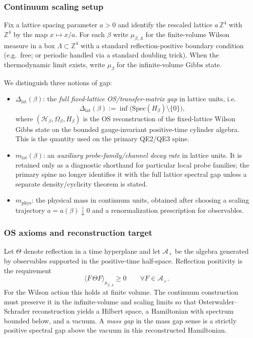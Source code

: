\subsubsection{Continuum scaling setup}
Fix a lattice spacing parameter $a>0$ and identify the rescaled lattice $a\,\mathbb Z^4$ with $\mathbb Z^4$ by the map
$x\mapsto x/a$. For each $\beta$ write $\mu_{\beta,\Lambda}$ for the finite-volume Wilson measure in a box
$\Lambda\subset\mathbb Z^4$ with a standard reflection-positive boundary condition (e.g.\ free; or periodic handled
via a standard doubling trick).
When the thermodynamic limit exists, write $\mu_\beta$ for the infinite-volume Gibbs state.

We distinguish three notions of gap:
\begin{itemize}[leftmargin=*]
\item $\Delta_{\mathrm{lat}}(\beta)$: the \emph{full fixed-lattice OS/transfer-matrix gap} in lattice units, i.e.
\[
\Delta_{\mathrm{lat}}(\beta):=\inf\bigl(\mathrm{Spec}(H_\beta)\setminus\{0\}\bigr),
\]
where $(\mathcal H_\beta,\Omega_\beta,H_\beta)$ is the OS reconstruction of the fixed-lattice Wilson Gibbs state on the bounded gauge-invariant positive-time cylinder algebra.
This is the quantity used on the primary QE2/QE3 spine.
\item $m_{\mathrm{lat}}(\beta)$: an \emph{auxiliary probe-family/channel decay rate} in lattice units.
It is retained only as a diagnostic shorthand for particular local probe families; the primary spine no longer identifies it with the full lattice spectral gap unless a separate density/cyclicity theorem is stated.
\item $m_{\mathrm{phys}}$: the physical mass in continuum units, obtained after choosing a scaling trajectory $a=a(\beta)\downarrow 0$
and a renormalization prescription for observables.
\end{itemize}

\subsubsection{OS axioms and reconstruction target}
Let $\Theta$ denote reflection in a time hyperplane and let $\mathcal A_+$ be the algebra generated by observables supported
in the positive-time half-space. Reflection positivity is the requirement
\[
\langle F\,\Theta F\rangle_{\mu_{\beta,\Lambda}}\ge 0\qquad\forall F\in\mathcal A_+.
\]
For the Wilson action this holds at finite volume. The continuum construction must preserve it in the infinite-volume and scaling limits so that
Osterwalder--Schrader reconstruction yields a Hilbert space, a Hamiltonian with spectrum bounded below, and a vacuum.
A \emph{mass gap} in the mass gap sense is a strictly positive spectral gap above the vacuum in this reconstructed Hamiltonian.

